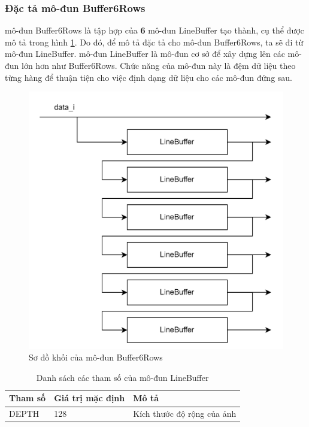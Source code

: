\subsubsection{Đặc tả mô-đun Buffer6Rows}
mô-đun Buffer6Rows là tập hợp của \textbf{6} mô-đun LineBuffer tạo thành, cụ thể được mô tả trong hình \ref{fig:buffer6RowsAr}. Do đó, để mô tả đặc tả cho mô-đun Buffer6Rows, ta sẽ đi từ mô-đun LineBuffer. mô-đun LineBuffer là mô-đun cơ sở để xây dựng lên các mô-đun lớn hơn như Buffer6Rows. Chức năng của mô-đun này là đệm dữ liệu theo từng hàng để thuận tiện cho việc định dạng dữ liệu cho các mô-đun đứng sau.

\begin{figure}[!ht]
    \centering
    \includegraphics[width=1\linewidth]{figures/buffer6RowsAr.png}
    \caption{Sơ đồ khối của mô-đun Buffer6Rows}
    \label{fig:buffer6RowsAr}
\end{figure}


\begin{table}[!ht]
    \centering
    \renewcommand{\arraystretch}{1.3} %
        \caption{Danh sách các tham số của mô-đun LineBuffer }
    \begin{tabular}{|p{3cm} p{4cm} p{8cm}|}
        \hline
        \rowcolor{gray!30}
        \textbf{Tham số } & \textbf{Giá trị mặc định}  & \textbf{Mô tả} \\
        \hline
        DEPTH & 128 & Kích thước độ rộng của ảnh
        \\ \hline
    \end{tabular}

    \label{tab:paramListLineBuffer}
\end{table}


